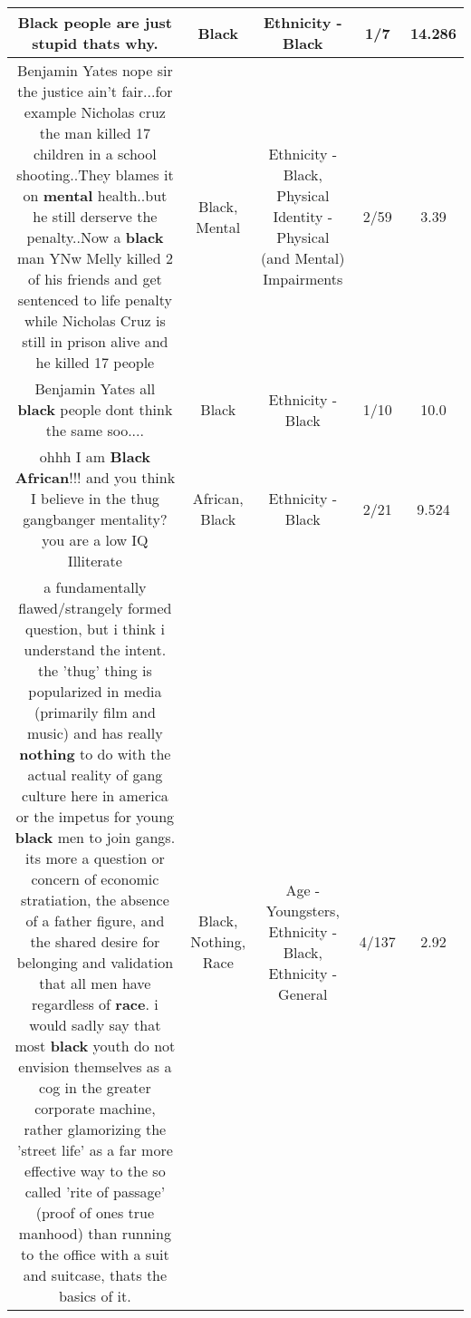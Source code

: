 \documentclass[11pt]{article}
\newlength\mylength
\begin{document}
\begin{center}
\begin{longtable}{|C{.65\mylength}|C{.30\mylength}|C{.12\mylength}|C{.12\mylength}|C{.12\mylength}|}
  \small Black people are just stupid thats why.\normalsize   & Black & Ethnicity - Black & 1/7 & 14.286 \\  \hline
  \small Benjamin Yates nope sir the justice ain't fair...for example Nicholas cruz the man killed 17 children in a school shooting..They blames it on \textbf{mental} health..but he still derserve the penalty..Now a \textbf{black} man YNw Melly killed 2 of his friends and get sentenced to life penalty while Nicholas Cruz is still in prison alive and he killed 17 people\normalsize   & Black, Mental & Ethnicity - Black, Physical Identity - Physical (and Mental) Impairments & 2/59 & 3.39 \\  \hline
  \small Benjamin Yates all \textbf{black} people dont think the same soo....\normalsize   & Black & Ethnicity - Black & 1/10 & 10.0 \\  \hline
  \small ohhh I am \textbf{Black} \textbf{African}!!! and you think I believe in the thug gangbanger mentality? you are a low IQ Illiterate\normalsize   & African, Black & Ethnicity - Black & 2/21 & 9.524 \\  \hline
  \small a fundamentally flawed/strangely formed question, but i think i understand the intent. the 'thug' thing is popularized in media (primarily film and music) and has really \textbf{nothing} to do with the actual reality of gang culture here in america or the impetus for young \textbf{black} men to join gangs. its more a question or concern of economic stratiation, the absence of a father figure, and the shared desire for belonging and validation that all men have regardless of \textbf{race}. i would sadly say that most \textbf{black} youth do not envision themselves as a cog in the greater corporate machine, rather glamorizing the 'street life' as a far more effective way to the so called 'rite of passage' (proof of ones true manhood) than running to the office with a suit and suitcase,  thats the basics of it.\normalsize   & Black, Nothing, Race & Age - Youngsters, Ethnicity - Black, Ethnicity - General & 4/137 & 2.92 \\  \hline

\end{longtable}
\end{center}
\end{document}
